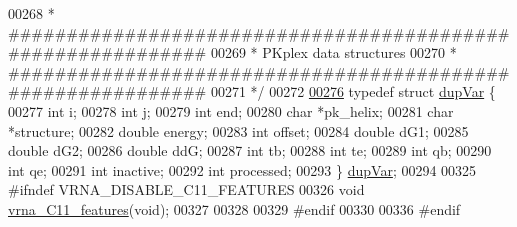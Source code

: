\begin{DoxyCode}
00268 \textcolor{comment}{ * ############################################################}
00269 \textcolor{comment}{ * PKplex data structures}
00270 \textcolor{comment}{ * ############################################################}
00271 \textcolor{comment}{ */}
00272 
\hyperlink{group__data__structures}{00276} \textcolor{keyword}{typedef} \textcolor{keyword}{struct }\hyperlink{group__data__structures_structdupVar}{dupVar} \{
00277   \textcolor{keywordtype}{int}     i;
00278   \textcolor{keywordtype}{int}     j;
00279   \textcolor{keywordtype}{int}     end;
00280   \textcolor{keywordtype}{char}    *pk\_helix;
00281   \textcolor{keywordtype}{char}    *structure;
00282   \textcolor{keywordtype}{double}  energy;
00283   \textcolor{keywordtype}{int}     offset;
00284   \textcolor{keywordtype}{double}  dG1;
00285   \textcolor{keywordtype}{double}  dG2;
00286   \textcolor{keywordtype}{double}  ddG;
00287   \textcolor{keywordtype}{int}     tb;
00288   \textcolor{keywordtype}{int}     te;
00289   \textcolor{keywordtype}{int}     qb;
00290   \textcolor{keywordtype}{int}     qe;
00291   \textcolor{keywordtype}{int}     inactive;
00292   \textcolor{keywordtype}{int}     processed;
00293 \} \hyperlink{group__data__structures_gabd3b93f9aaa9f3acce2d148bae97d24e}{dupVar};
00294 
00325 \textcolor{preprocessor}{#ifndef VRNA\_DISABLE\_C11\_FEATURES}
00326 \textcolor{keywordtype}{void} \hyperlink{group__data__structures_ga21744ae2d6a17309f9327d3547cef0cb}{vrna\_C11\_features}(\textcolor{keywordtype}{void});
00327 
00328 
00329 \textcolor{preprocessor}{#endif}
00330 
00336 \textcolor{preprocessor}{#endif}
\end{DoxyCode}
